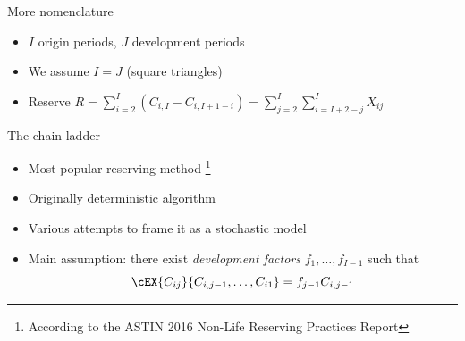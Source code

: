 \documentclass[tikz]{beamer}
\begin{document}
\begin{frame}{More nomenclature}
  \begin{itemize}
    \item $I$ origin periods, $J$ development periods
    \item We assume $I = J$ (square triangles)
    \item Reserve $R = \sum_{i = 2}^I (C_{i, I} - C_{i, I + 1 - i}) = \sum_{j = 2}^I \sum_{i = I + 2 - j}^I X_{ij}$
  \end{itemize}
\end{frame}

\begin{frame}{The chain ladder}
  \begin{itemize}
    \item Most popular reserving method \footnote{According to the ASTIN 2016 Non-Life Reserving Practices Report}
    \item Originally deterministic algorithm
    \item Various attempts to frame it as a stochastic model
    \item Main assumption: there exist \emph{development factors} $f_1, \dots, f_{I - 1}$ such that
          \begin{equation*}
            \cEX{C_{ij}}{C_{i, j - 1}, \dots, C_{i1}} = f_{j - 1} C_{i, j - 1}
          \end{equation*}
  \end{itemize}
\end{frame}
\end{document}
